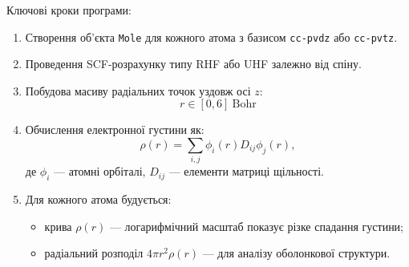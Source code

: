 Ключові кроки програми:
\begin{enumerate}
    \item Створення об'єкта \texttt{Mole} для кожного атома з базисом \texttt{cc-pvdz} або \texttt{cc-pvtz}.
    \item Проведення SCF-розрахунку типу RHF або UHF залежно від спіну.
    \item Побудова масиву радіальних точок уздовж осі $z$:
          $$ r \in [0, 6] \ \text{Bohr} $$
    \item Обчислення електронної густини як:
          \[
              \rho(r) = \sum_{i,j} \phi_i(r) D_{ij} \phi_j(r),
          \]
          де $\phi_i$ --- атомні орбіталі, $D_{ij}$ --- елементи матриці щільності.
    \item Для кожного атома будується:
          \begin{itemize}
              \item крива $\rho(r)$ --- логарифмічний масштаб показує різке спадання густини;
              \item радіальний розподіл $4\pi r^2\rho(r)$ --- для аналізу оболонкової структури.
          \end{itemize}
\end{enumerate}

